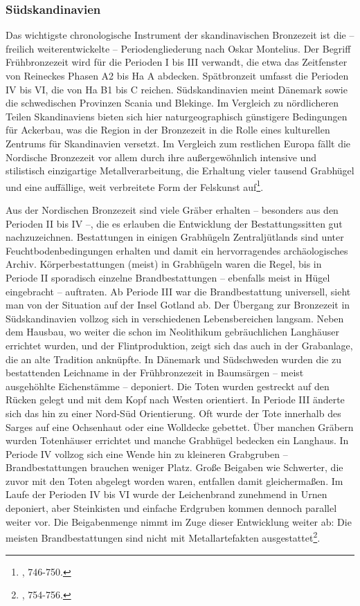 \documentclass[openany,twoside,twocolumn]{book}
\let\rmarkdownfootnote\footnote%
\def\footnote{\protect\rmarkdownfootnote}
\begin{document}
\hypertarget{sudskandinavien}{%
\subsubsection{Südskandinavien}\label{sudskandinavien}}

Das wichtigste chronologische Instrument der skandinavischen Bronzezeit
ist die -- freilich weiterentwickelte -- Periodengliederung nach Oskar
Montelius. Der Begriff Frühbronzezeit wird für die Perioden I bis III
verwandt, die etwa das Zeitfenster von Reineckes Phasen A2 bis Ha A
abdecken. Spätbronzeit umfasst die Perioden IV bis VI, die von Ha B1 bis
C reichen. Südskandinavien meint Dänemark sowie die schwedischen
Provinzen Scania und Blekinge. Im Vergleich zu nördlicheren Teilen
Skandinaviens bieten sich hier naturgeographisch günstigere Bedingungen
für Ackerbau, was die Region in der Bronzezeit in die Rolle eines
kulturellen Zentrums für Skandinavien versetzt. Im Vergleich zum
restlichen Europa fällt die Nordische Bronzezeit vor allem durch ihre
außergewöhnlich intensive und stilistisch einzigartige
Metallverarbeitung, die Erhaltung vieler tausend Grabhügel und eine
auffällige, weit verbreitete Form der Felskunst auf\footnote{\textcite{thrane_scandinavia_2013},
  746-750.}.

Aus der Nordischen Bronzezeit sind viele Gräber erhalten -- besonders
aus den Perioden II bis IV --, die es erlauben die Entwicklung der
Bestattungssitten gut nachzuzeichnen. Bestattungen in einigen Grabhügeln
Zentraljütlands sind unter Feuchtbodenbedingungen erhalten und damit ein
hervorragendes archäologisches Archiv. Körperbestattungen (meist) in
Grabhügeln waren die Regel, bis in Periode II sporadisch einzelne
Brandbestattungen -- ebenfalls meist in Hügel eingebracht -- auftraten.
Ab Periode III war die Brandbestattung universell, sieht man von der
Situation auf der Insel Gotland ab. Der Übergang zur Bronzezeit in
Südskandinavien vollzog sich in verschiedenen Lebensbereichen langsam.
Neben dem Hausbau, wo weiter die schon im Neolithikum gebräuchlichen
Langhäuser errichtet wurden, und der Flintproduktion, zeigt sich das
auch in der Grabanlage, die an alte Tradition anknüpfte. In Dänemark und
Südschweden wurden die zu bestattenden Leichname in der Frühbronzezeit
in Baumsärgen -- meist ausgehöhlte Eichenstämme -- deponiert. Die Toten
wurden gestreckt auf den Rücken gelegt und mit dem Kopf nach Westen
orientiert. In Periode III änderte sich das hin zu einer Nord-Süd
Orientierung. Oft wurde der Tote innerhalb des Sarges auf eine
Ochsenhaut oder eine Wolldecke gebettet. Über manchen Gräbern wurden
Totenhäuser errichtet und manche Grabhügel bedecken ein Langhaus. In
Periode IV vollzog sich eine Wende hin zu kleineren Grabgruben --
Brandbestattungen brauchen weniger Platz. Große Beigaben wie Schwerter,
die zuvor mit den Toten abgelegt worden waren, entfallen damit
gleichermaßen. Im Laufe der Perioden IV bis VI wurde der Leichenbrand
zunehmend in Urnen deponiert, aber Steinkisten und einfache Erdgruben
kommen dennoch parallel weiter vor. Die Beigabenmenge nimmt im Zuge
dieser Entwicklung weiter ab: Die meisten Brandbestattungen sind nicht
mit Metallartefakten ausgestattet\footnote{\textcite{thrane_scandinavia_2013},
  754-756.}.
\end{document}
